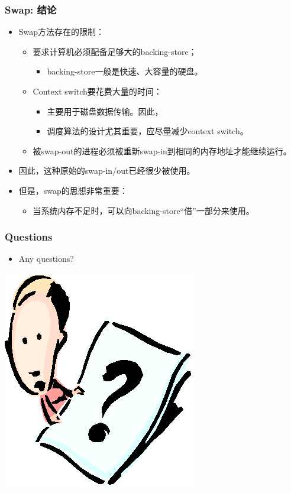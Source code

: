 \documentclass[CJKutf8,xcolor=pdftex,dvipsnames,table]{beamer}
\begin{document}
\begin{CJK*}{UTF8}{song}
  \begin{frame}
  \frametitle{Swap: 结论} \pause
  \begin{itemize}
  \item{Swap方法存在的限制：} \pause
    \begin{itemize}
    \item{要求计算机必须配备足够大的backing-store；} \pause
      \begin{itemize}
      \item{backing-store一般是快速、大容量的硬盘。} \pause
      \end{itemize}
    \item{Context switch要花费大量的时间：} \pause
      \begin{itemize}
      \item{主要用于磁盘数据传输。因此，} \pause
      \item{调度算法的设计尤其重要，应尽量减少context switch。} \pause
      \end{itemize}
    \item{被swap-out的进程必须被重新swap-in到相同的内存地址才能继续运行。} \pause
    \end{itemize}
  \item{因此，这种原始的swap-in/out已经很少被使用。} \pause
  \item{但是，swap的思想非常重要：} \pause
    \begin{itemize}
    \item{当系统内存不足时，可以向backing-store“借”一部分来使用。}
    \end{itemize}
  \end{itemize}
  \end{frame}
  
  \begin{frame}
  \frametitle{Questions}
  \begin{itemize}
  \item{Any questions?}
  \end{itemize}
  \begin{center}
    \includegraphics[scale=.5]{question}
  \end{center}
  \end{frame}
  

\end{CJK*}
\end{document}
